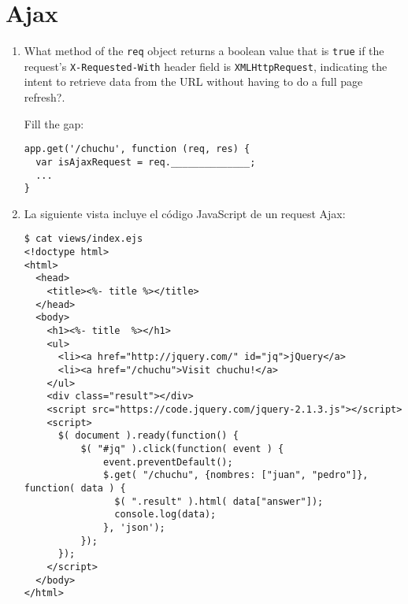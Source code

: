 \documentclass[spanish,a4paper,11pt]{article}
\begin{document}
\section{Ajax}
\begin{enumerate}
\item 
What method of the \verb|req| object returns 
a boolean value that is \verb|true| if the request’s \verb|X-Requested-With| header field is 
\verb|XMLHttpRequest|, indicating the intent 
to retrieve data from the  URL without having to do a full page refresh?.

Fill the gap:
\begin{verbatim}
app.get('/chuchu', function (req, res) {
  var isAjaxRequest = req.______________;
  ...
}
\end{verbatim}
\item  La siguiente vista  incluye el código JavaScript de un request Ajax:
\begin{verbatim}
$ cat views/index.ejs 
<!doctype html>
<html>
  <head>
    <title><%- title %></title>
  </head>
  <body>
    <h1><%- title  %></h1>
    <ul>
      <li><a href="http://jquery.com/" id="jq">jQuery</a>
      <li><a href="/chuchu">Visit chuchu!</a>
    </ul>
    <div class="result"></div>
    <script src="https://code.jquery.com/jquery-2.1.3.js"></script>
    <script>
      $( document ).ready(function() {
          $( "#jq" ).click(function( event ) {
              event.preventDefault();
              $.get( "/chuchu", {nombres: ["juan", "pedro"]}, function( data ) {
                $( ".result" ).html( data["answer"]);
                console.log(data);
              }, 'json');
          });
      });
    </script>
  </body>
</html>
\end{verbatim}


\end{enumerate}
\end{document}
